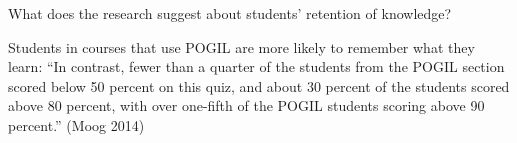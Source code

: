 \Q What does the research suggest about students' retention of knowledge?

\begin{answer}[5em]
Students in courses that use POGIL are more likely to remember what they learn:
``In contrast, fewer than a quarter of the students from the POGIL section scored below 50 percent on this quiz, and about 30 percent of the students scored above 80 percent, with over one-fifth of the POGIL students scoring above 90 percent.'' (Moog 2014)
\end{answer}
